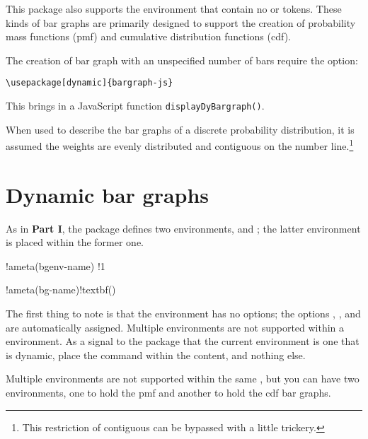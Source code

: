 \documentclass{article}
\let\uif\textsf
\edef\amtIndent{\the\parindent}
\begin{document}
This package also supports the  environment that contain no
 or  tokens. These kinds of bar graphs are primarily
designed to support the creation of probability mass functions (pmf) and
cumulative distribution functions (cdf).

The creation of bar graph with an unspecified number of bars require the
 option:
\begin{Verbatim}[xleftmargin=\amtIndent]
\usepackage[dynamic]{bargraph-js}
\end{Verbatim}
This brings in a JavaScript function \texttt{displayDyBargraph()}.

When used to describe the bar graphs of a discrete probability distribution,
it is assumed the weights are evenly distributed and contiguous on the number
line.\footnote{This restriction of contiguous can be bypassed with a little
trickery.}


\section{Dynamic bar graphs}

As in \textbf{Part I}, the package defines two environments,
 and ; the latter environment is placed within
the former one.
\bVerb\def\1{\hskip\amtIndent\relax}\takeMeasure{\1\string\begin\darg{bargraph}\darg{\ameta{bg-name}}%
\textbf{\string\isdynamic}\string\end\darg{bargraph}}%
\begin{dCmd}[commandchars=!()]{\bxSize}
\begin{bargraphenv}{!ameta(bgenv-name)}
!1\begin{bargraph}{!ameta(bg-name)}!textbf(\isdynamic)\end{bargraph}
\end{bargraphenv}
\end{dCmd}
\eVerb The first thing to note is that the  environment has no
options; the options , , and  are
automatically assigned. Multiple  environments are not
supported within a  environment. As a signal to the package
that the current  environment is one that is dynamic, place the
 command within the  content, and nothing else.

Multiple  environments are not supported within the same
, but you can have two  environments, one to hold
the \uif{pmf} and another to hold the \uif{cdf} bar graphs.
\end{document}
